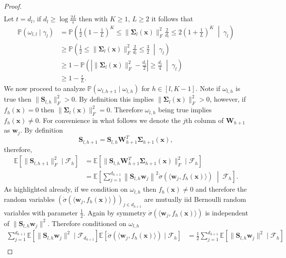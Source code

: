\documentclass{article}
\theoremstyle{definition}
\renewcommand{\P}{\mathbb{P}}
\newcommand{\E}{\mathbb{E}}
\newcommand{\mc}{\mathcal}
\def\vw{{\bm{w}}}
\def\vx{{\bm{x}}}
\def\mS{{\bm{S}}}
\def\mW{{\bm{W}}}
\begin{document}
\begin{proof}
\begin{align*}
    \end{align*}
    Let $t = d_l$, if $d_l \geq \log \frac{2L}{\epsilon}$ then with $K\geq 1$, $L\geq 2$ it follows that
    \begin{align*}
        \P(\omega_{l,l} \mid \gamma_l)
        &= \P\left(\frac{1}{2}\left(1 - \frac{1}{L}\right)^K \leq \|\bm{\Sigma}_l(\vx)\|_F^2 \frac{2}{d_l} \leq 2\left(1 + \frac{1}{L}\right)^K \; \middle| \; \gamma_l \right)\\
        &\geq \P\left(\frac{1}{2} \leq \|\bm{\Sigma}_l(\vx)\|_F^2 \frac{2}{d_l} \leq \frac{3}{2} \; \middle| \; \gamma_l \right)\\
        &\geq 1 - \P\left(\left|\|\bm{\Sigma}_l(\vx)\|_F^2 - \frac{d_l}{2}\right| \geq \frac{d_l}{4} \; \middle|\; \gamma_l \right)\\
        &\geq 1 - \frac{\epsilon}{L}.
    \end{align*} 
    We now proceed to analyze $\P(\omega_{l, h+1} \mid \omega_{l, h})$ for $h \in [l, K-1]$. Note if $\omega_{l, h}$ is true then $\|\mS_{l, h} \|_F^2 > 0$. By definition this implies $\| \bm{\Sigma}_l(\vx) \|_F^2 > 0$, however, if $f_h(\vx) = 0$ then  $\| \bm{\Sigma}_l(\vx) \|_F^2 = 0$. Therefore $\omega_{l, h}$ being true implies $f_h(\vx) \neq 0$. For convenience in what follows we denote the $j$th column of $\mW_{h+1}$ as $\vw_j$. By definition
    \[
        \mS_{l, h+1} = \mS_{l, h}\mW_{h+1}^T \bm{\Sigma}_{h+1}(\vx),
    \]
    therefore,
    \begin{align*}
        \E[\|\mS_{l, h+1}\|_F^2 \mid \mc{F}_{h} ] &= \E[\|\mS_{l, h} \mW_{h+1}^T \bm{\Sigma}_{h+1}(\vx)\|_F^2  \mid \mc{F}_{h} ]\\
        &= \E\left[\sum_{j = 1}^{d_{h+1}} \left\|\mS_{l, h}\vw_j\right\|^2 \dot{\sigma}(\langle \vw_j, f_{h}(\vx) \rangle) \; \middle| \; \mc{F}_{h}\right].
    \end{align*}
    As highlighted already, if we condition on $\omega_{l, h}$ then $f_h(\vx)\neq 0$ and therefore the random variables $(\dot{\sigma}(\langle \vw_j, f_{h}(\vx) \rangle))_{j \in d_{h+1}}$ are mutually iid Bernoulli random variables with parameter $\frac{1}{2}$. Again by symmetry $\dot{\sigma}(\langle \vw_j, f_{h}(\vx) \rangle)$ is independent of $\| \mS_{l, h}\vw_j \|^2 $. Therefore conditioned on $\omega_{l,h}$
    \begin{align*}
        \sum_{j = 1}^{d_{h+1}}\E[\|\mS_{l, h}\vw_j\|^2 \mid \mc{F}_{d_{h+1}} ]\E[\dot{\sigma}(\langle \vw_j, f_{h}(\vx) \rangle) \mid \mc{F}_{h} ]
        &= \frac{1}{2}\sum_{j = 1}^{d_{h+1}}\E[\|\mS_{l, h}\vw_j\|^2 \mid \mc{F}_{h} ]\\

\end{align*}
\end{proof}
\end{document}

